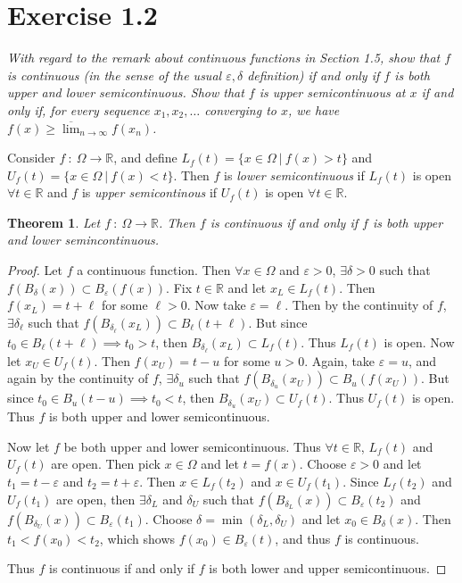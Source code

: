 \documentclass[12pt]{article}
\theoremstyle{plain}
\newtheorem{theorem}{Theorem}
\newenvironment{definition}[1][Definition]{\begin{trivlist}
\item[\hskip \labelsep {\bfseries #1}]}{\end{trivlist}}
\begin{document}
\section*{Exercise 1.2}
\textit{With regard to the remark about continuous functions in Section 1.5, show that $f$ is continuous (in the sense of the usual $\varepsilon, \delta$ definition) if and only if $f$ is both upper and lower semicontinuous.  Show that $f$ is upper semicontinuous at $x$ if and only if, for every sequence $x_1, x_2, \dots$ converging to $x$, we have $f(x) \geq \overline{\lim}_{n\rightarrow \infty} f(x_n)$.}

\begin{definition}
    Consider $f\ :\ \Omega \rightarrow \mathbb{R}$, and define $L_f(t) = \{x \in \Omega\ |\ f(x) > t\}$ and $U_f(t) = \{x \in \Omega\ |\ f(x) < t\}$.  Then $f$ is \emph{lower semicontinuous} if $L_f(t)$ is open $\forall t \in \mathbb{R}$ and $f$ is \emph{upper semicontinous} if $U_f(t)$ is open $\forall t \in \mathbb{R}$.
\end{definition}
\begin{theorem}
    Let $f\ :\ \Omega \rightarrow \mathbb{R}$.  Then $f$ is continuous if and only if $f$ is both upper and lower semincontinuous.
\end{theorem}
\begin{proof}
    Let $f$ a continuous function.  Then $\forall x \in \Omega$ and $\varepsilon > 0$, $\exists \delta > 0$ such that $f(B_\delta(x)) \subset B_\varepsilon(f(x))$.  Fix $t \in \mathbb{R}$ and let $x_L \in L_f(t)$.  Then $f(x_L) = t + \ell$ for some $\ell > 0$.  Now take $\varepsilon = \ell$.  Then by the continuity of $f$, $\exists \delta_\ell$ such that $f(B_{\delta_\ell}(x_L)) \subset B_\ell(t + \ell)$.  But since $t_0 \in B_\ell(t + \ell) \implies t_0 > t$, then $B_{\delta_\ell}(x_L) \subset L_f(t)$.  Thus $L_f(t)$ is open.  Now let $x_U \in U_f(t)$.  Then $f(x_U) = t - u$ for some $u > 0$.  Again, take $\varepsilon = u$, and again by the continuity of $f$, $\exists \delta_u$ such that $f(B_{\delta_u}(x_U)) \subset B_u(f(x_U))$.  But since $t_0 \in B_u(t - u) \implies t_0 < t$, then $B_{\delta_u}(x_U) \subset U_f(t)$.  Thus $U_f(t)$ is open.  Thus $f$ is both upper and lower semicontinuous.

    Now let $f$ be both upper and lower semicontinuous.  Thus $\forall t \in \mathbb{R}$, $L_f(t)$ and $U_f(t)$ are open.  Then pick $x \in \Omega$ and let $t = f(x)$.  Choose $\varepsilon > 0$ and let $t_1 = t - \varepsilon$ and $t_2 = t + \varepsilon$.  Then $x \in L_f(t_2)$ and $x \in U_f(t_1)$.  Since $L_f(t_2)$ and $U_f(t_1)$ are open, then $\exists \delta_L$ and $\delta_U$ such that $f(B_{\delta_L}(x)) \subset B_\varepsilon(t_2)$ and $f(B_{\delta_U}(x)) \subset B_\varepsilon(t_1)$.  Choose $\delta = \min(\delta_L, \delta_U)$ and let $x_0 \in B_\delta(x)$.  Then $t_1 < f(x_0) < t_2$, which shows $f(x_0) \in B_\varepsilon(t)$, and thus $f$ is continuous.

    Thus $f$ is continuous if and only if $f$ is both lower and upper semicontinuous.
\end{proof}
\end{document}
